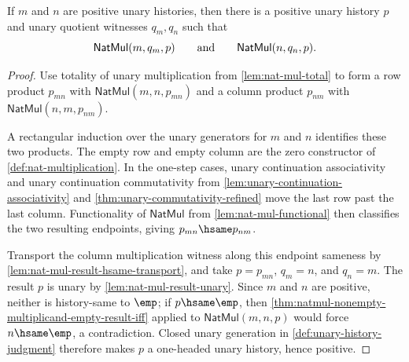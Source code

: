 \begin{lemma}
\label{lem:positive-unary-common-product}
If $m$ and $n$ are positive unary histories, then there is a positive unary history $p$ and unary quotient witnesses $q_m,q_n$ such that
$$
\mathsf{NatMul}(m,q_m,p)\qquad\hbox{and}\qquad \mathsf{NatMul}(n,q_n,p).
$$
\end{lemma}
\begin{proof}
Use totality of unary multiplication from \autoref{lem:nat-mul-total} to form a row product $p_{mn}$ with $\mathsf{NatMul}(m,n,p_{mn})$ and a column product $p_{nm}$ with $\mathsf{NatMul}(n,m,p_{nm})$.

A rectangular induction over the unary generators for $m$ and $n$ identifies these two products. The empty row and empty column are the zero constructor of \autoref{def:nat-multiplication}. In the one-step cases, unary continuation associativity and unary continuation commutativity from \autoref{lem:unary-continuation-associativity} and \autoref{thm:unary-commutativity-refined} move the last row past the last column. Functionality of $\mathsf{NatMul}$ from \autoref{lem:nat-mul-functional} then classifies the two resulting endpoints, giving $p_{mn}\hsame p_{nm}$.

Transport the column multiplication witness along this endpoint sameness by \autoref{lem:nat-mul-result-hsame-transport}, and take $p=p_{mn}$, $q_m=n$, and $q_n=m$. The result $p$ is unary by \autoref{lem:nat-mul-result-unary}. Since $m$ and $n$ are positive, neither is history-same to $\emp$; if $p\hsame\emp$, then \autoref{thm:natmul-nonempty-multiplicand-empty-result-iff} applied to $\mathsf{NatMul}(m,n,p)$ would force $n\hsame\emp$, a contradiction. Closed unary generation in \autoref{def:unary-history-judgment} therefore makes $p$ a one-headed unary history, hence positive.
\end{proof}

